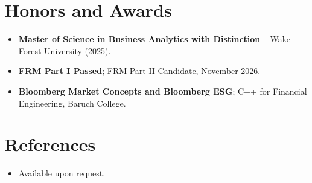 \documentclass[11pt,a4paper,sans]{moderncv}
\begin{document}

\section{Honors and Awards}
\vspace{1pt}
\begin{itemize}
\item{\textbf{Master of Science in Business Analytics with Distinction} -- Wake Forest University (2025).}
\item{\textbf{FRM Part I Passed}; FRM Part II Candidate, November 2026.}
\item{\textbf{Bloomberg Market Concepts and Bloomberg ESG}; C++ for Financial Engineering, Baruch College.}
\end{itemize}


\section{References}
\vspace{1pt}
\begin{itemize}
\item{Available upon request.}
\end{itemize}
\end{document}
